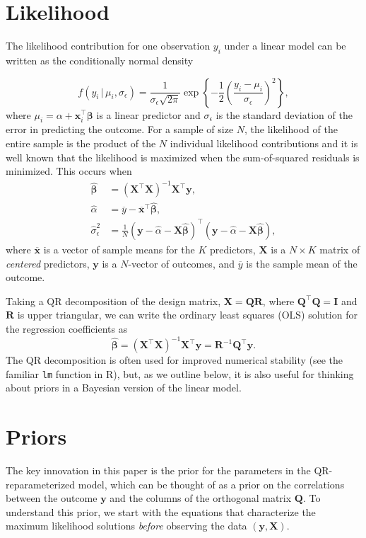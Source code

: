 \documentclass[11pt]{article}
\newcommand{\boldbeta}{\boldsymbol{\beta}}
\newcommand{\hatbeta}{\widehat{\boldbeta}}
\newcommand{\hatalpha}{\widehat{\alpha}}
\newcommand{\sigmaEps}{\sigma_{\epsilon}}
\newcommand{\X}{\mathbf{X}}
\newcommand{\y}{\mathbf{y}}
\newcommand{\Q}{\mathbf{Q}}
\newcommand{\R}{\mathbf{R}}
\begin{document}
\section{Likelihood}
\label{sec:likelihood}

The likelihood contribution for one observation $y_i$ under a linear model
can be written as the conditionally normal density

$$
f \left(y_i \,|\, \mu_i, \sigmaEps \right) = \frac{1}{\sigmaEps \sqrt{2 \pi}}
\exp{\left\{-\frac{1}{2} \left(\frac{y_i - \mu_i}{\sigmaEps}\right)^2\right\}},
$$
%
where $\mu_i = \alpha + \mathbf{x}_i^\top \boldbeta$ is a linear
predictor and $\sigmaEps$ is the standard deviation of the error in predicting
the outcome. For a sample of size $N$, the likelihood of the entire sample is
the product of the $N$ individual likelihood contributions and it is well known
that the likelihood is maximized when the sum-of-squared residuals is minimized.
This occurs when
%
\begin{align*}
\hatbeta &= \left(\X^\top \X \right)^{-1} \X^\top \y,\\
\hatalpha &= \overline{y} - \overline{\mathbf{x}}^\top \hatbeta,\\
\widehat{\sigma}_{\epsilon}^2 &=
  \frac{1}{N}
  \left(\y - \hatalpha - \X \hatbeta \right)^\top
  \left(\y - \hatalpha - \X \hatbeta \right),
\end{align*}
%
where $\overline{\mathbf{x}}$ is a vector of sample means for the
$K$ predictors, $\X$ is a $N \times K$ matrix of \emph{centered} predictors,
$\y$ is a $N$-vector of outcomes, and $\overline{y}$ is the sample mean of the
outcome.

Taking a QR decomposition of the design matrix, $\X = \Q\R$, where
$\Q^\top \Q = \mathbf{I}$ and $\R$ is upper triangular, we can write the
ordinary least squares (OLS) solution for the regression coefficients as
$$\hatbeta = \left(\X^\top \X \right)^{-1} \X^\top \y = \R^{-1} \Q^\top \y.$$
%
The QR decomposition is often used for improved numerical stability (see the
familiar {\tt lm} function in R), but, as we outline below, it is also useful
for thinking about priors in a Bayesian version of the linear model.


\section{Priors}
\label{sec:priors}

The key innovation in this paper is the prior for the parameters in the
QR-reparameterized model, which can be thought of as a prior on the correlations
between the outcome $\y$ and the columns of the orthogonal matrix $\Q$. To
understand this prior, we start with the equations that characterize the maximum
likelihood solutions \emph{before} observing the data $\left(\y, \X\right)$.
\end{document}
